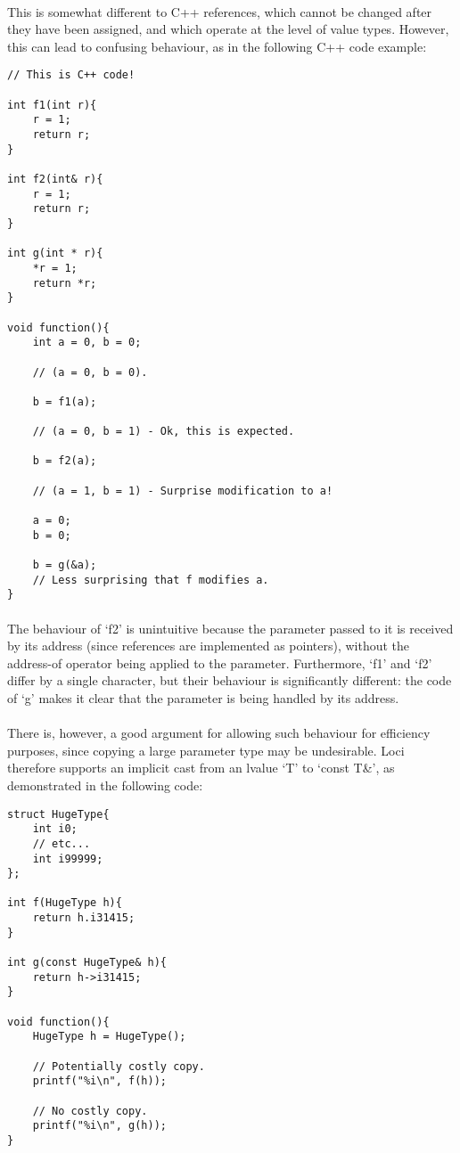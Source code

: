\documentclass[12pt,twoside,notitlepage]{report}
\begin{document}
\paragraph{}
This is somewhat different to C++ references, which cannot be changed after they have been assigned, and which operate at the level of value types. However, this can lead to confusing behaviour, as in the following C++ code example:

\small{
\begin{verbatim}
// This is C++ code!

int f1(int r){
    r = 1;
    return r;
}

int f2(int& r){
    r = 1;
    return r;
}

int g(int * r){
    *r = 1;
    return *r;
}

void function(){
    int a = 0, b = 0;
    
    // (a = 0, b = 0).
    
    b = f1(a);
    
    // (a = 0, b = 1) - Ok, this is expected.
    
    b = f2(a);
    
    // (a = 1, b = 1) - Surprise modification to a!
    
    a = 0;
    b = 0;
    
    b = g(&a);
    // Less surprising that f modifies a.
}
\end{verbatim}
}

\paragraph{}
The behaviour of `f2' is unintuitive because the parameter passed to it is received by its address (since references are implemented as pointers), without the address-of operator being applied to the parameter. Furthermore, `f1' and `f2' differ by a single character, but their behaviour is significantly different: the code of `g' makes it clear that the parameter is being handled by its address.

\paragraph{}
There is, however, a good argument for allowing such behaviour for efficiency purposes, since copying a large parameter type may be undesirable. Loci therefore supports an implicit cast from an lvalue `T' to `const T\&', as demonstrated in the following code:

\small{
\begin{verbatim}
struct HugeType{
    int i0;
    // etc...
    int i99999;
};

int f(HugeType h){
    return h.i31415;
}

int g(const HugeType& h){
    return h->i31415;
}

void function(){
    HugeType h = HugeType();
    
    // Potentially costly copy.
    printf("%i\n", f(h));
    
    // No costly copy.
    printf("%i\n", g(h));
}
\end{verbatim}
}
\end{document}
